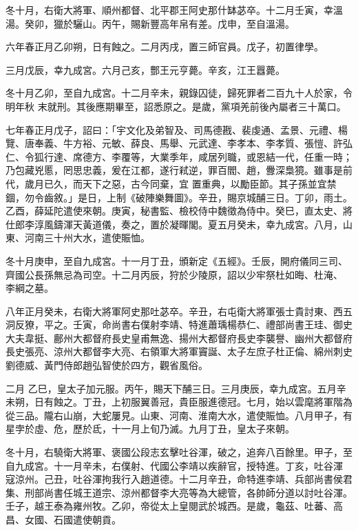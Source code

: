 \begin{pinyinscope}
 冬十月，右衛大將軍、順州都督、北平郡王阿史那什缽苾卒。十二月壬寅，幸溫湯。癸卯，獵於驪山。丙午，賜新豐高年帛有差。戊申，至自溫湯。



 六年春正月乙卯朔，日有蝕之。二月丙戌，置三師官員。戊子，初置律學。



 三月戊辰，幸九成宮。六月己亥，酆王元亨薨。辛亥，江王囂薨。



 冬十月乙卯，至自九成宮。十二月辛未，親錄囚徒，歸死罪者二百九十人於家，令明年秋
 末就刑。其後應期畢至，詔悉原之。是歲，黨項羌前後內屬者三十萬口。



 七年春正月戊子，詔曰：「宇文化及弟智及、司馬德戡、裴虔通、孟景、元禮、楊覽、唐奉義、牛方裕、元敏、薛良、馬舉、元武達、李孝本、李孝質、張愷、許弘仁、令狐行達、席德方、李覆等，大業季年，咸居列職，或恩結一代，任重一時；乃包藏兇慝，罔思忠義，爰在江都，遂行弒逆，罪百閻、趙，釁深梟獍。雖事是前代，歲月已久，而天下之惡，古今同棄，宜
 置重典，以勵臣節。其子孫並宜禁錮，勿令齒敘。」是日，上制《破陣樂舞圖》。辛丑，賜京城酺三日。丁卯，雨土。乙酉，薛延陀遣使來朝。庚寅，秘書監、檢校侍中魏徵為侍中。癸巳，直太史、將仕郎李淳風鑄渾天黃道儀，奏之，置於凝暉閣。夏五月癸未，幸九成宮。八月，山東、河南三十州大水，遣使賑恤。



 冬十月庚申，至自九成宮。十一月丁丑，頒新定《五經》。壬辰，開府儀同三司、齊國公長孫無忌為司空。十二月丙辰，狩於少陵原，詔以少牢祭杜如晦、杜淹、
 李綱之墓。



 八年正月癸未，右衛大將軍阿史那吐苾卒。辛丑，右屯衛大將軍張士貴討東、西五洞反獠，平之。壬寅，命尚書右僕射李靖、特進蕭瑀楊恭仁、禮部尚書王珪、御史大夫韋挺、鄜州大都督府長史皇甫無逸、揚州大都督府長史李襲譽、幽州大都督府長史張亮、涼州大都督李大亮、右領軍大將軍竇誕、太子左庶子杜正倫、綿州刺史劉德威、黃門侍郎趙弘智使於四方，觀省風俗。



 二月
 乙巳，皇太子加元服。丙午，賜天下酺三日。三月庚辰，幸九成宮。五月辛未朔，日有蝕之。丁丑，上初服翼善冠，貴臣服進德冠。七月，始以雲麾將軍階為從三品。隴右山崩，大蛇屢見。山東、河南、淮南大水，遣使賑恤。八月甲子，有星孛於虛、危，歷於氐，十一月上旬乃滅。九月丁丑，皇太子來朝。



 冬十月，右驍衛大將軍、褒國公段志玄擊吐谷渾，破之，追奔八百餘里。甲子，至自九成宮。十一月辛未，右僕射、代國公李靖以疾辭官，授特進。丁亥，吐谷渾
 寇涼州。己丑，吐谷渾拘我行入趙道德。十二月辛丑，命特進李靖、兵部尚書侯君集、刑部尚書任城王道宗、涼州都督李大亮等為大總管，各帥師分道以討吐谷渾。壬子，越王泰為雍州牧。乙卯，帝從太上皇閱武於城西。是歲，龜茲、吐蕃、高昌、女國、石國遣使朝貢。




\end{pinyinscope}
